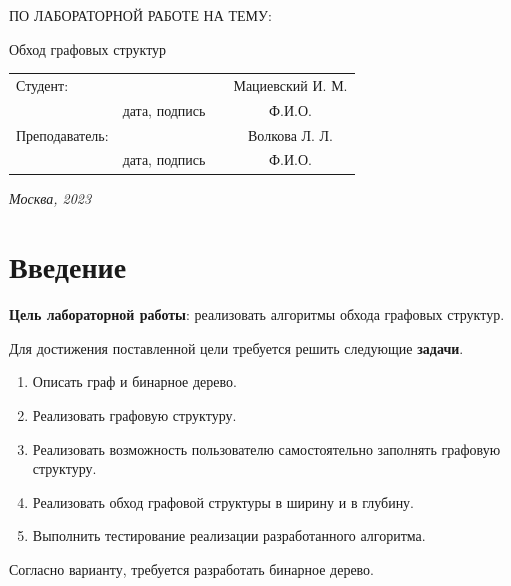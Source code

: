 \documentclass[12pt, a4paper]{article}
\begin{document}
\begin{titlepage}
\begin{center}
\begin{bf}
    \fontsize{20}{30}\selectfont
    ПО ЛАБОРАТОРНОЙ РАБОТЕ НА ТЕМУ:

    Обход графовых структур

   \end{bf}
  \end{center}

  \fontsize{14}{21}\selectfont
  \vspace{5cm}


  \noindent\begin{tabularx}{\textwidth}{ X >{\centering}p{4cm} p{1cm} c }
   Студент: & & & Мациевский И. М. \\ \cline{2-2} \cline{4-4}
   & \fontsize{10}{15}\selectfont дата, подпись & & \fontsize{10}{15}\selectfont Ф.И.О. \\
   Преподаватель: & & & Волкова Л. Л.\\ \cline{2-2} \cline{4-4}
   & \fontsize{10}{15}\selectfont дата, подпись & & \fontsize{10}{15}\selectfont Ф.И.О.
   \end{tabularx}

  \vspace{\fill}

  \begin{center}
   \it{Москва}, 2023
  \end{center}

  \thispagestyle{empty}
\end{titlepage}\newpage
\tableofcontents
\newpage
\section*{Введение}
\justifying
\textbf{Цель лабораторной работы}: реализовать алгоритмы обхода графовых структур.

Для достижения поставленной цели требуется решить следующие \textbf{задачи}.
\begin{enumerate}
\item Описать граф и бинарное дерево.
\item Реализовать графовую структуру.
\item Реализовать возможность пользователю самостоятельно заполнять графовую структуру.
\item Реализовать обход графовой структуры в ширину и в глубину.
\item Выполнить тестирование реализации разработанного алгоритма.
\end{enumerate}

Согласно варианту, требуется разработать бинарное дерево.
\end{document}
